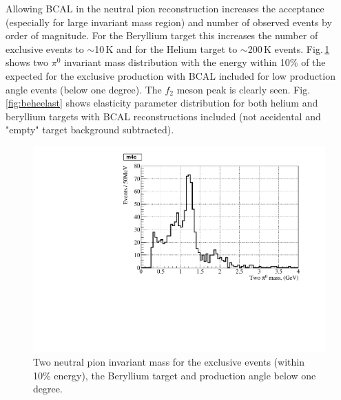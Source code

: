 Allowing BCAL in the neutral pion reconstruction increases the acceptance (especially for large invariant mass region) and number of observed events by order of magnitude. For the Beryllium target this increases the number of exclusive events to $\sim$10$\,$K and for the Helium target to $\sim$200$\,$K events. Fig.$\,$\ref{fig:bemass} shows two $\pi^0$ invariant mass distribution with the energy within 10$\%$ of the expected for the exclusive production with BCAL included for low production angle events (below one degree). The $f_2$ meson peak is clearly seen. Fig.$\,$\ref{fig:beheelast} shows elasticity parameter distribution for both helium and beryllium targets with BCAL reconstructions included (not accidental and "empty" target background subtracted).
\begin{figure}[!h]
\centering\includegraphics[width=4.75in]{figures/be_mass.pdf}
\caption{Two neutral pion invariant mass for the exclusive events (within 10\% energy), the Beryllium target and production angle below one degree.
\label{fig:bemass}}
\end{figure}
